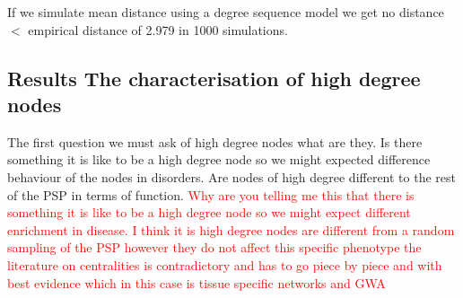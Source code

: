 
If we simulate mean distance using a degree sequence model we get no distance $<$ empirical distance of 2.979 in 1000 simulations.
\subsection{Results The characterisation of high degree nodes}
The first question we must ask of high degree nodes what are they. Is there something it is like to be a high degree node so we might expected difference behaviour of the nodes in disorders.
Are nodes of high degree different to the rest of the PSP in terms of function. 
\textcolor{red}{Why are you telling me this that there is something it is like to be a high degree node so we might expect different enrichment in disease. I think it is high degree nodes are different from a random sampling of the PSP however they do not affect this specific phenotype the literature on centralities is contradictory and has to go piece by piece and with best evidence which in this case is tissue specific networks and GWA}

